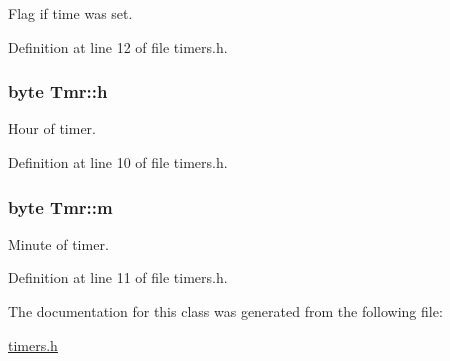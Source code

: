 Flag if time was set. 



Definition at line 12 of file timers.\+h.

\hypertarget{struct_tmr_ab0374a7fbe830064a06fb13512453ffa}{
\subsubsection[{h}]{\setlength{\rightskip}{0pt plus 5cm}byte Tmr\+::h}}\label{struct_tmr_ab0374a7fbe830064a06fb13512453ffa}


Hour of timer. 



Definition at line 10 of file timers.\+h.

\hypertarget{struct_tmr_a554c428f359f6d17e82324b0c7568f1a}{
\subsubsection[{m}]{\setlength{\rightskip}{0pt plus 5cm}byte Tmr\+::m}}\label{struct_tmr_a554c428f359f6d17e82324b0c7568f1a}


Minute of timer. 



Definition at line 11 of file timers.\+h.



The documentation for this class was generated from the following file\+:\begin{DoxyCompactItemize}
\item 
\hyperlink{timers_8h}{timers.\+h}\end{DoxyCompactItemize}
